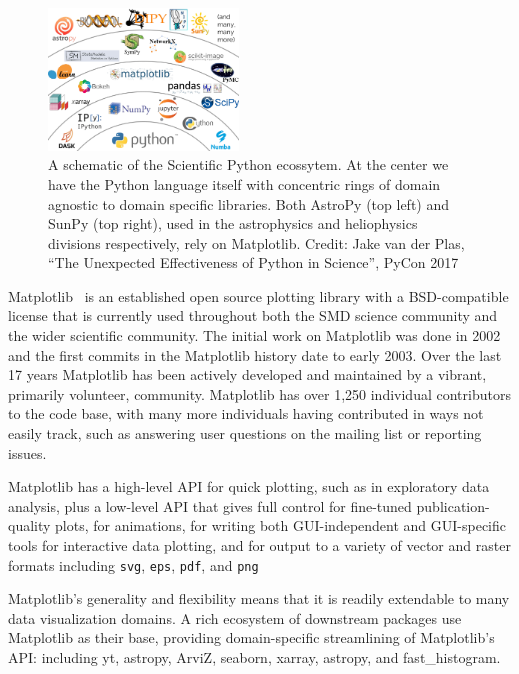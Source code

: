 \documentclass[12pt]{article}
\numberwithin{page}{section}
\begin{document}
\begin{figure}
  \includegraphics[width=0.45\textwidth]{scipy-ecosystem}
  \caption{A schematic of the Scientific Python ecossytem.  At the
    center we have the Python language itself with concentric rings of
    domain agnostic to domain specific libraries.  Both AstroPy (top
    left) and SunPy (top right), used in the astrophysics and
    heliophysics divisions respectively, rely on Matplotlib.
    Credit: Jake van der Plas, ``The Unexpected Effectiveness of Python
    in Science'', PyCon 2017}
  \label{fig:ecosystem}
\end{figure}



Matplotlib~\cite{Hunter:2007} is an established open source plotting
library with a BSD-compatible license that is currently used
throughout both the SMD science community and the wider scientific
community.  The initial work on Matplotlib was done in 2002 and the
first commits in the Matplotlib history date to early 2003.  Over the
last 17 years Matplotlib has been actively developed and maintained by
a vibrant, primarily volunteer, community.  Matplotlib has over 1,250
individual contributors to the code base, with many more individuals
having contributed in ways not easily track, such as answering user
questions on the mailing list or reporting issues.

Matplotlib has a high-level API for quick plotting, such as in
exploratory data analysis, plus a low-level API that gives full control for
fine-tuned publication-quality plots, for animations, for writing both
GUI-independent and GUI-specific tools for interactive data plotting, and
for output to a variety of vector and raster
formats including \texttt{svg}, \texttt{eps},
\texttt{pdf}, and \texttt{png}

Matplotlib's generality and flexibility means that it is readily extendable to
many data visualization domains.  A rich ecosystem of downstream packages use
Matplotlib as their base, providing domain-specific streamlining of
Matplotlib's API: including yt, astropy, ArviZ, seaborn, xarray, astropy, and
fast\_histogram.
\end{document}
